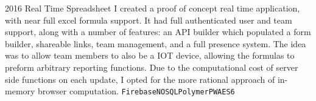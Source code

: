 \documentclass[9pt]{developercv} %
\begin{document}
\newpage
{}
\begin{entrylist}
  \entry
  {2016}
  {Real Time Spreadsheet}
  {}
  {
    I created a proof of concept real time application, with near full excel formula support. It had full authenticated user and team support, along with a number of features: an API builder which populated a form builder, shareable links, team management, and a full presence system. The idea was   to allow team members to also be a IOT device, allowing the formulas to preform arbitrary reporting functions. Due to the computational cost of server side functions on each update, I opted for the more rational approach of in-memory browser computation.
    \texttt{Firebase}\slashsep\texttt{NOSQL}\slashsep\texttt{Polymer}\slashsep\texttt{PWA}\slashsep\texttt{ES6}
    }
\end{entrylist}


\end{document}
